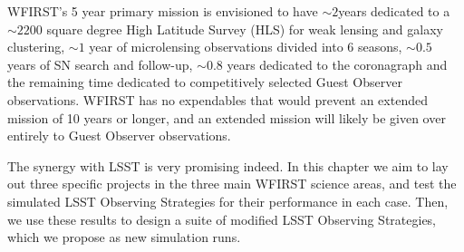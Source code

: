 WFIRST's  5 year primary mission is envisioned to have $\sim2$years dedicated to a
$\sim2200$ square degree High Latitude Survey (HLS) for weak lensing and
galaxy clustering,  $\sim1$ year of microlensing observations divided into 6
seasons, $\sim0.5$ years of SN search and follow-up, $\sim0.8$ years dedicated to
the coronagraph and the remaining time dedicated to competitively selected Guest
Observer observations. WFIRST has no expendables that would prevent an
extended mission of 10 years or longer, and an extended mission will likely be
given over entirely to Guest Observer observations.

The synergy with LSST is very promising indeed. In this chapter we aim
to  lay out three  specific projects in the three main WFIRST science
areas, and test the simulated LSST Observing
Strategies for their performance in each case. Then, we use these
results to design a suite of modified LSST Observing Strategies, which
we propose as new \OpSim simulation runs.














\navigationbar
